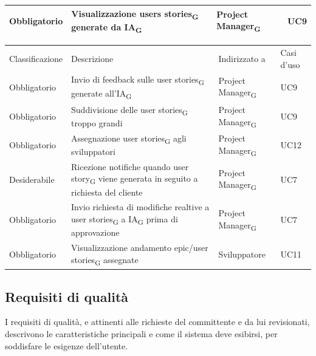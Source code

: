 \documentclass{article}
\begin{document}
\begin{center}
\begin{tabular}{|p{3cm}|p{6cm}|p{}|p{3cm}|}
\hline
\rowcolor{LightBlue}

Obbligatorio & Visualizzazione users stories\textsubscript{G} generate da IA\textsubscript{G}  & Project Manager\textsubscript{G} & UC9\\
\hline



\end{tabular}

    \begin{tabular}{|p{3cm}|p{6cm}|p{}|p{3cm}|}
    \rowcolor{Blue} 
\hline
Classificazione & Descrizione & Indirizzato a&Casi d'uso  \\ 
\rowcolor{LightBlue}
\hline
Obbligatorio & Invio di feedback sulle user stories\textsubscript{G} generate all'IA\textsubscript{G}& Project Manager\textsubscript{G}&UC9\\
\hline
\rowcolor{LighterBlue}

Obbligatorio & Suddivisione delle user stories\textsubscript{G} troppo grandi  & Project Manager\textsubscript{G}& UC9\\
\hline
\rowcolor{LightBlue}

Obbligatorio & Assegnazione user stories\textsubscript{G} agli sviluppatori& Project Manager\textsubscript{G}& UC12\\
\hline
\rowcolor{LighterBlue}

Desiderabile & Ricezione notifiche quando user story\textsubscript{G} viene generata in seguito a richiesta del cliente & Project Manager\textsubscript{G} & UC7\\
\hline
\rowcolor{LightBlue}

Obbligatorio & Invio richiesta di modifiche realtive a user stories\textsubscript{G} a IA\textsubscript{G} prima di approvazione& Project Manager\textsubscript{G}& UC7\\
\hline
\rowcolor{LighterBlue}

Obbligatorio & Visualizzazione andamento epic/user stories\textsubscript{G} assegnate& Sviluppatore& UC11\\

\hline
\end{tabular}
\end{center}

\subsection{Requisiti di qualità}
I requisiti di qualità, e attinenti alle richieste del committente e da lui revisionati,  descrivono le caratteristiche principali e come il sistema deve esibirsi, per soddisfare le esigenze dell'utente.
\end{document}
